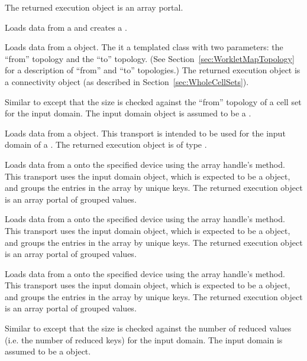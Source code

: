 \begin{description}
  The returned execution object is an array portal.
\item[\vtkmcontarg{TransportTagAtomicArray}] 
  Loads data from a  and creates a .
\item[\vtkmcontarg{TransportTagCellSetIn}] 
  Loads data from a  object.
  The  it a templated class with two parameters: the ``from'' topology and the ``to'' topology.
  (See Section~\ref{sec:WorkletMapTopology} for a description of ``from'' and ``to'' topologies.)
  The returned execution object is a connectivity object (as described in Section~\ref{sec:WholeCellSets}).
\item[\vtkmcontarg{TransportTagTopologyFieldIn}] 
  Similar to  except that the size is checked against the ``from'' topology of a cell set for the input domain.
  The input domain object is assumed to be a .
\item[\vtkmcontarg{TransportTagKeysIn}] 
  Loads data from a  object.
  This transport is intended to be used for the input domain of a .
  The returned execution object is of type .
\item[\vtkmcontarg{TransportTagKeyedValuesIn}] 
  Loads data from a  onto the specified device using the array handle's  method.
  This transport uses the input domain object, which is expected to be a  object, and groups the entries in the array by unique keys.
  The returned execution object is an array portal of grouped values.
\item[\vtkmcontarg{TransportTagKeyedValuesOut}] 
  Loads data from a  onto the specified device using the array handle's  method.
  This transport uses the input domain object, which is expected to be a  object, and groups the entries in the array by unique keys.
  The returned execution object is an array portal of grouped values.
\item[\vtkmcontarg{TransportTagKeyedValuesInOut}] 
  Loads data from a  onto the specified device using the array handle's  method.
  This transport uses the input domain object, which is expected to be a  object, and groups the entries in the array by unique keys.
  The returned execution object is an array portal of grouped values.
\item[\vtkmcontarg{TransportTagReducedValuesIn}] 
  Similar to  except that the size is checked against the number of reduced values (i.e. the number of reduced keys) for the input domain.
  The input domain is assumed to be a  object.
\end{description}

